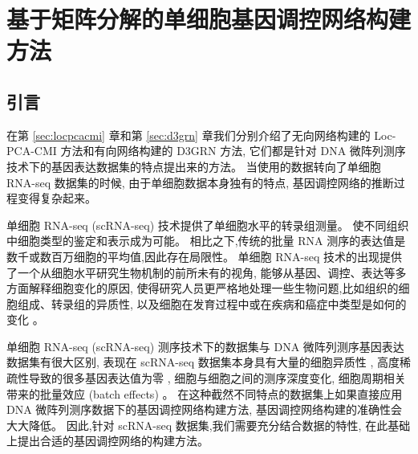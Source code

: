 \section{基于矩阵分解的单细胞基因调控网络构建方法}
\label{sec:scgrnhunter}

\subsection{引言}

在第 \ref{sec:locpcacmi} 章和第 \ref{sec:d3grn} 章我们分别介绍了无向网络构建的 Loc-PCA-CMI 方法和有向网络构建的 D3GRN 方法, 
它们都是针对 DNA 微阵列测序技术下的基因表达数据集的特点提出来的方法。
当使用的数据转向了单细胞 RNA-seq 数据集的时候, 由于单细胞数据本身独有的特点, 基因调控网络的推断过程变得复杂起来。

单细胞 RNA-seq (scRNA-seq) 技术提供了单细胞水平的转录组测量。
使不同组织中细胞类型的鉴定和表示成为可能。
相比之下,传统的批量 RNA 测序的表达值是数千或数百万细胞的平均值,因此存在局限性。
单细胞 RNA-seq 技术的出现提供了一个从细胞水平研究生物机制的前所未有的视角,
能够从基因、调控、表达等多方面解释细胞变化的原因,
使得研究人员更严格地处理一些生物问题,比如组织的细胞组成、转录组的异质性,
以及细胞在发育过程中或在疾病和癌症中类型是如何的变化 \cite{kumar2017understanding,patel2014single}。

单细胞 RNA-seq (scRNA-seq) 测序技术下的数据集与 DNA 微阵列测序基因表达数据集有很大区别, 
表现在 scRNA-seq 数据集本身具有大量的细胞异质性 \cite{wagner2016revealing},
高度稀疏性导致的很多基因表达值为零 \cite{vallejos2017normalizing},
细胞与细胞之间的测序深度变化, 细胞周期相关带来的批量效应 (batch effects) \cite{buettner2015computational}。
在这种截然不同特点的数据集上如果直接应用 DNA 微阵列测序数据下的基因调控网络构建方法,
基因调控网络构建的准确性会大大降低。
%
因此,针对 scRNA-seq 数据集,我们需要充分结合数据的特性,
在此基础上提出合适的基因调控网络的构建方法。

